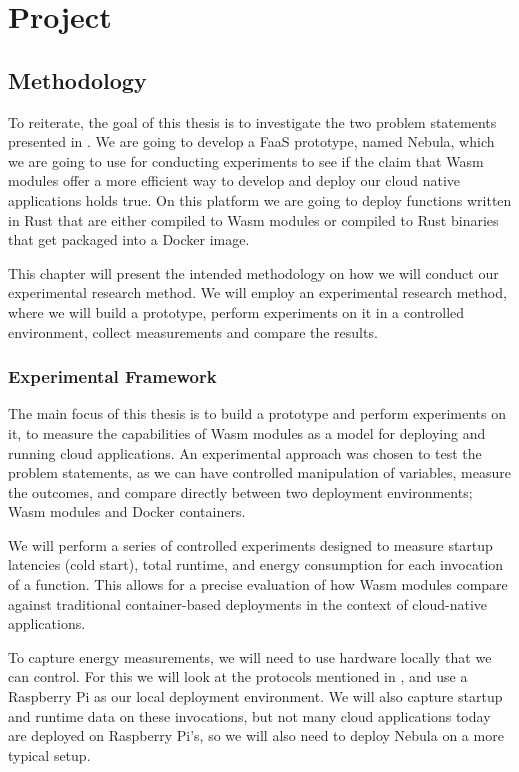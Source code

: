 \documentclass[
  table]{report}
\begin{document}
\part{Project}

\chapter{Methodology} 
\label{chap:method}

To reiterate, the goal of this thesis is to investigate the two problem
statements presented in . We are going to develop a
FaaS prototype, named Nebula, which we are going to use for conducting
experiments to see if the claim that \ac{Wasm} modules offer a more
efficient way to develop and deploy our cloud native applications holds
true. On this platform we are going to deploy functions written in Rust
that are either compiled to \ac{Wasm} modules or compiled to Rust
binaries that get packaged into a Docker image.

This chapter will present the intended methodology on how we will
conduct our experimental research method. We will employ an experimental
research method, where we will build a prototype, perform experiments on
it in a controlled environment, collect measurements and compare the
results.

\section{Experimental Framework}
\label{sect:exp_frame}

The main focus of this thesis is to build a prototype and perform
experiments on it, to measure the capabilities of \ac{Wasm} modules as a
model for deploying and running cloud applications. An experimental
approach was chosen to test the problem statements, as we can have
controlled manipulation of variables, measure the outcomes, and compare
directly between two deployment environments; \ac{Wasm} modules and
Docker containers.

We will perform a series of controlled experiments designed to measure
startup latencies (cold start), total runtime, and energy consumption
for each invocation of a function. This allows for a precise evaluation
of how \ac{Wasm} modules compare against traditional container-based
deployments in the context of cloud-native applications.

To capture energy measurements, we will need to use hardware locally
that we can control. For this we will look at the protocols mentioned in
, and use a Raspberry Pi as our local
deployment environment. We will also capture startup and runtime data on
these invocations, but not many cloud applications today are deployed on
Raspberry Pi's, so we will also need to deploy Nebula on a more typical
setup.
\end{document}
